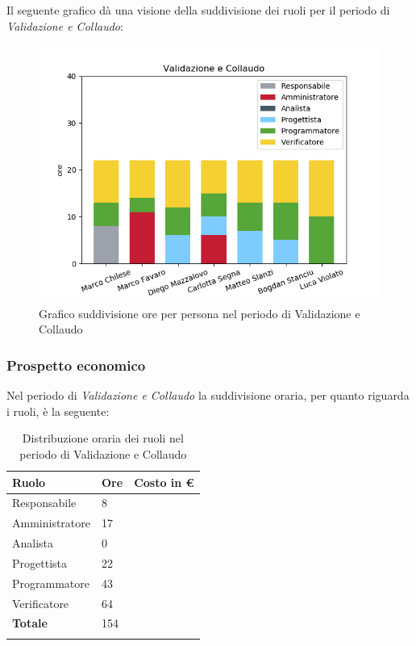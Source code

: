 Il seguente grafico dà una visione della suddivisione dei ruoli per il periodo di \textit{Validazione e Collaudo}:

\begin{figure}[H]
	\centering
	\includegraphics[width=1\linewidth]{./images/fig_vc.png}
	\caption{Grafico suddivisione ore per persona nel periodo di Validazione e Collaudo}
	\label{fig:grafico suddivione ruoli periodo vc}
\end{figure}


\subsubsection{Prospetto economico}
Nel periodo di \textit{Validazione e Collaudo} la suddivisione oraria, per quanto riguarda i ruoli, è la seguente: 


\begin{longtable}{| C{.30\textwidth}| C{.15\textwidth}| C{.20\textwidth}|}
	\hline
	\textbf{Ruolo} & \textbf{Ore} & \textbf{Costo in \euro} \\
	\hline 
	Responsabile & 8 &  \\
	\hline
	Amministratore & 17 & \\
	\hline
	Analista & 0 &  \\
	\hline
	Progettista & 22 &  \\
	\hline
	Programmatore & 43 &  \\
	\hline
	Verificatore & 64 &  \\
	\hline
	\textbf{Totale} & 154 & \\ 
	\hline
	
	\caption{Distribuzione oraria dei ruoli nel periodo di Validazione e Collaudo}
	\label{Distribuzione oraria del periodo di Validazione e collaudo}
\end{longtable}

